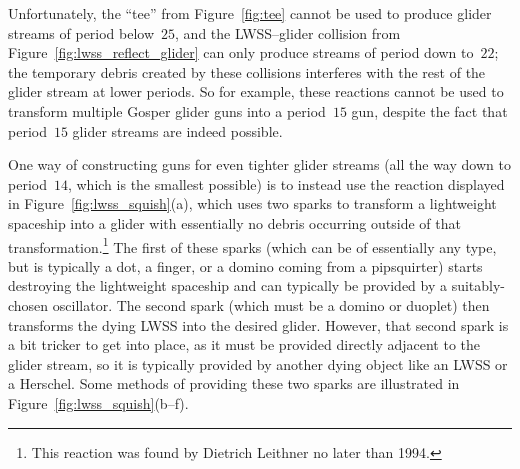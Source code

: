 Unfortunately, the ``tee'' from Figure~\ref{fig:tee} cannot be used to produce glider streams of period below~$25$, and the LWSS--glider collision from Figure~\ref{fig:lwss_reflect_glider} can only produce streams of period down to~$22$; the temporary debris created by these collisions interferes with the rest of the glider stream at lower periods. So for example, these reactions cannot be used to transform multiple Gosper glider guns into a period~$15$ gun, despite the fact that period~$15$ glider streams are indeed possible.

One way of constructing guns for even tighter glider streams (all the way down to period~$14$, which is the smallest possible) is to instead use the reaction displayed in Figure~\ref{fig:lwss_squish}(a), which uses two sparks to transform a lightweight spaceship into a glider with essentially no debris occurring outside of that transformation.\footnote{This reaction was found by Dietrich Leithner no later than 1994.} The first of these sparks (which can be of essentially any type, but is typically a dot, a finger, or a domino coming from a pipsquirter) starts destroying the lightweight spaceship and can typically be provided by a suitably-chosen oscillator. The second spark (which must be a domino or duoplet) then transforms the dying LWSS into the desired glider. However, that second spark is a bit tricker to get into place, as it must be provided directly adjacent to the glider stream, so it is typically provided by another dying object like an LWSS or a Herschel. Some methods of providing these two sparks are illustrated in Figure~\ref{fig:lwss_squish}(b--f).

